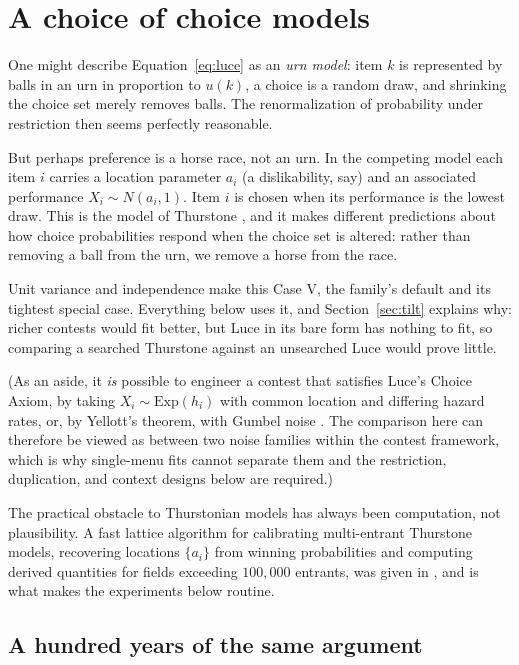 \documentclass[11pt]{article}
\begin{document}
\section{A choice of choice models}
\label{sec:models}

One might describe Equation~\eqref{eq:luce} as an \emph{urn model}: item
$k$ is represented by balls in an urn in proportion to $u(k)$, a choice is
a random draw, and shrinking the choice set merely removes balls. The
renormalization of probability under restriction then seems perfectly
reasonable.

But perhaps preference is a horse race, not an urn. In the competing model
each item $i$ carries a location parameter $a_i$ (a dislikability, say) and
an associated performance $X_i \sim N(a_i, 1)$. Item $i$ is chosen when its
performance is the lowest draw. This is the model of Thurstone
\cite{thurstone1927}, and it makes different predictions about how choice
probabilities respond when the choice set is altered: rather than removing
a ball from the urn, we remove a horse from the race.

Unit variance and independence make this Case V, the family's default and its
tightest special case. Everything below uses it, and Section~\ref{sec:tilt}
explains why: richer contests would fit better, but Luce in its bare form has
nothing to fit, so comparing a searched Thurstone against an unsearched Luce
would prove little.

(As an aside, it \emph{is} possible to engineer a contest that satisfies
Luce's Choice Axiom, by taking $X_i \sim \mathrm{Exp}(h_i)$ with common
location and differing hazard rates, or, by Yellott's theorem, with
Gumbel noise \cite{yellott1977}. The comparison here can therefore be
viewed as between two noise families within the contest framework, which
is why single-menu fits cannot separate them and the restriction,
duplication, and context designs below are required.)

The practical obstacle to Thurstonian models has always been computation,
not plausibility. A fast lattice algorithm for calibrating multi-entrant
Thurstone models, recovering locations $\{a_i\}$ from winning
probabilities and computing derived quantities for fields exceeding
$100{,}000$ entrants, was given in \cite{cotton2021}, and is what makes
the experiments below routine.

\subsection{A hundred years of the same argument}
\label{sec:history}
\end{document}
